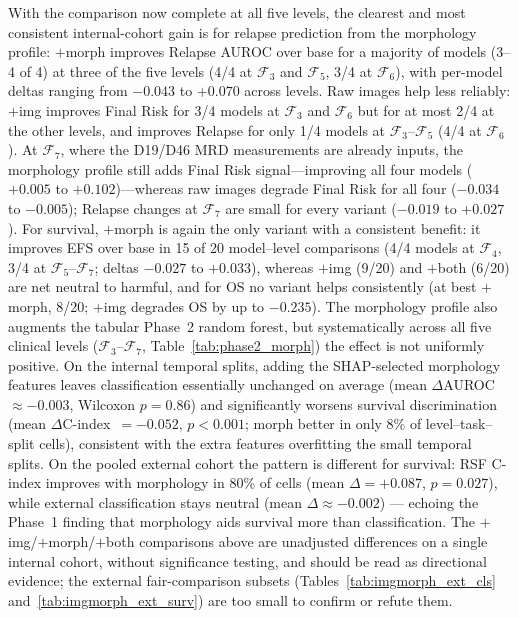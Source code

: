 \documentclass[pdflatex,sn-nature]{sn-jnl}
\begin{document}
With the comparison now complete at all five levels, the clearest and
most consistent internal-cohort gain is for relapse prediction from
the morphology profile: $+$morph improves Relapse AUROC over base for
a majority of models (3--4 of 4) at three of the five levels (4/4 at
$\mathcal{F}_3$ and $\mathcal{F}_5$, 3/4 at $\mathcal{F}_6$), with
per-model deltas ranging from $-0.043$ to $+0.070$ across levels.
Raw images help less reliably: $+$img improves Final Risk for 3/4
models at $\mathcal{F}_3$ and $\mathcal{F}_6$ but for at most 2/4 at
the other levels, and improves Relapse for only 1/4 models at
$\mathcal{F}_3$--$\mathcal{F}_5$ (4/4 at $\mathcal{F}_6$).
At $\mathcal{F}_7$, where the D19/D46 MRD measurements are already
inputs, the morphology profile still adds Final Risk signal—improving
all four models ($+0.005$ to $+0.102$)—whereas raw images degrade
Final Risk for all four ($-0.034$ to $-0.005$); Relapse changes at
$\mathcal{F}_7$ are small for every variant ($-0.019$ to $+0.027$).
For survival, $+$morph is again the only variant with a consistent
benefit: it improves EFS over base in 15 of 20 model--level
comparisons (4/4 models at $\mathcal{F}_4$, 3/4 at
$\mathcal{F}_5$--$\mathcal{F}_7$; deltas $-0.027$ to $+0.033$),
whereas $+$img (9/20) and $+$both (6/20) are net neutral to harmful,
and for OS no variant helps consistently (at best $+$morph, 8/20;
$+$img degrades OS by up to $-0.235$).
The morphology profile also augments the tabular Phase~2 random
forest, but systematically across all five clinical levels
($\mathcal{F}_3$--$\mathcal{F}_7$, Table~\ref{tab:phase2_morph}) the
effect is not uniformly positive. On the internal temporal splits,
adding the SHAP-selected morphology features leaves classification
essentially unchanged on average (mean $\Delta$AUROC~$\approx-0.003$,
Wilcoxon $p=0.86$) and significantly worsens survival discrimination
(mean $\Delta$C-index~$=-0.052$, $p<0.001$; morph better in only
8\% of level--task--split cells), consistent with the extra features
overfitting the small temporal splits. On the pooled external
cohort the pattern is different for survival: RSF C-index improves
with morphology in 80\% of cells (mean $\Delta=+0.087$, $p=0.027$),
while external classification stays neutral (mean
$\Delta\approx-0.002$) — echoing the Phase~1 finding that morphology
aids survival more than classification.
The $+$img/$+$morph/$+$both comparisons above are unadjusted differences on a single internal cohort, without
significance testing, and should be read as directional evidence; the
external fair-comparison subsets (Tables~\ref{tab:imgmorph_ext_cls}
and~\ref{tab:imgmorph_ext_surv}) are too small to confirm or refute
them.
\end{document}
